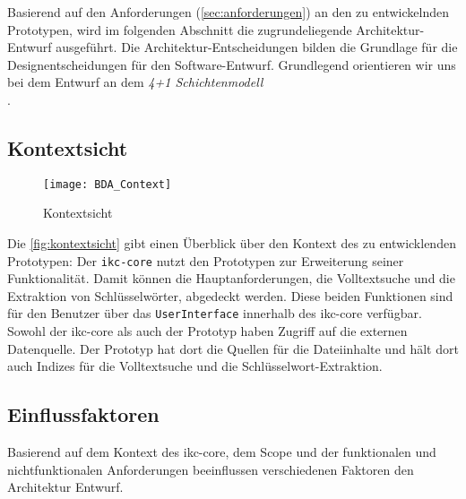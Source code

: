 
Basierend auf den Anforderungen (\autoref{sec:anforderungen}) an den zu entwickelnden Prototypen, wird im folgenden Abschnitt die zugrundeliegende Architektur-Entwurf ausgeführt. Die Ar\-chi\-tek\-tur-\-Ent\-schei\-dung\-en bilden die Grundlage für die Designentscheidungen für den Soft\-wa\-re-\-Ent\-wurf. Grundlegend orientieren wir uns bei dem Entwurf an dem \textit{4+1 Schichtenmodell} \\\cite{kruchten1995architectural}.




\subsection{Kontextsicht}
    \begin{figure}[ht]
    \centering
    \texttt{[image: BDA\_Context]}
    \caption{Kontextsicht}
    \label{fig:kontextsicht}
    \end{figure}
 
 Die \autoref{fig:kontextsicht} gibt einen Überblick über den Kontext des zu entwicklenden Prototypen:
 Der \texttt{ikc-core} nutzt den Prototypen zur Erweiterung seiner Funktionalität. Damit können die Hauptanforderungen, die Volltextsuche und die Extraktion von Schlüsselwörter, abgedeckt werden. Diese beiden Funktionen sind für den Benutzer über das \texttt{UserInterface} innerhalb des \gls{ikc-core} verfügbar. Sowohl der \gls{ikc-core} als auch der Prototyp haben Zugriff auf die externen Datenquelle. Der Prototyp hat dort die Quellen für die Dateiinhalte und hält dort auch Indizes für die Volltextsuche und die Schlü\-ssel\-wort-Ex\-trak\-tion.
 



\subsection{Einflussfaktoren}\label{einflussfaktoren}

Basierend auf dem Kontext des \gls{ikc-core}, dem Scope und der funktionalen und nichtfunktionalen Anforderungen beeinflussen verschiedenen Faktoren den Architektur Entwurf.

